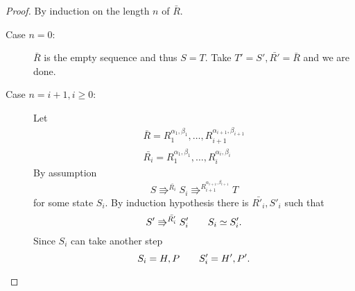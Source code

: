 \begin{proof}
  By induction on the length $n$ of $\bar{R}$.
  \begin{description}
    \item[Case $n = 0$:] $\bar{R}$ is the empty sequence and thus $S = T$. Take
      $T' = S', \bar{R'} = \bar{R}$ and we are done.
    \item[Case $n = i + 1, i \geq 0$:] Let
      \begin{equation*}
        \begin{gathered}
          \bar{R} = R_1^{\alpha_1, \beta_1}, \dots, R_{i+1}^{\alpha_{i+1},
          \beta_{i+1}} \\
          \bar{R_i} = R_1^{\alpha_1, \beta_1}, \dots, R_{i}^{\alpha_{i},
          \beta_{i}}
        \end{gathered}
      \end{equation*}
      By assumption
      \begin{equation*}
        S \Rrightarrow^{\bar{R_i}} S_i \Rrightarrow^{R_{i+1}^{\alpha_{i+1},
        \beta_{i+1}}} T
      \end{equation*}
      for some state $S_i$. By induction hypothesis there is $\bar{R'_i}, S'_i$
      such that
      \begin{equation}
        S' \Rrightarrow^{\bar{R'_i}} S'_i \quad\quad S_i \simeq S'_i.
      \end{equation}
      Since $S_i$ can take another step
      \begin{equation*}
        S_i = H, P \quad\quad S'_i = H', P'.
      \end{equation*}
      

\end{description}
\end{proof}
